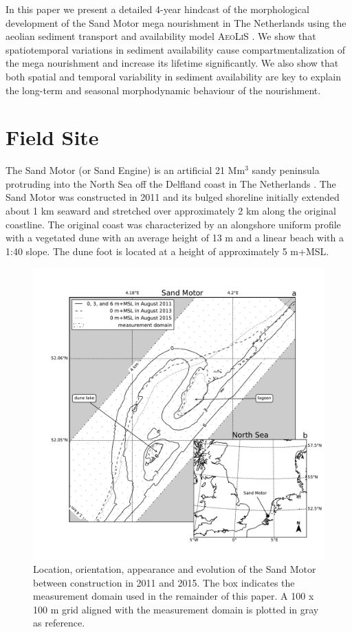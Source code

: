 \documentclass[preprint,12pt,authoryear]{elsarticle}
\begin{document}
In this paper we present a detailed 4-year hindcast of the
morphological development of the Sand Motor mega nourishment in The
Netherlands using the aeolian sediment transport and availability
model \textsc{AeoLiS} \citep{Hoonhout2016}. We show that
spatiotemporal variations in sediment availability cause
compartmentalization of the mega nourishment and increase its lifetime
significantly. We also show that both spatial and temporal variability
in sediment availability are key to explain the long-term and seasonal
morphodynamic behaviour of the nourishment.

\section{Field Site}
\label{sec:fieldsite3}

The Sand Motor (or Sand Engine) is an artificial 21 $\mathrm{Mm^3}$
sandy peninsula protruding into the North Sea off the Delfland coast
in The Netherlands \citep[Figure \ref{fig:fieldsite3},][]{Stive2013}.
The Sand Motor was constructed in 2011 and its bulged shoreline
initially extended about 1 km seaward and stretched over approximately
2 km along the original coastline. The original coast was
characterized by an alongshore uniform profile with a vegetated dune
with an average height of 13 m and a linear beach with a 1:40
slope. The dune foot is located at a height of approximately 5 m+MSL.

\begin{figure}
  \centering
  \includegraphics[width=\columnwidth]{../Figures/location_and_evolution}
  \caption{Location, orientation, appearance and evolution of the Sand
    Motor between construction in 2011 and 2015. The box indicates the
    measurement domain used in the remainder of this paper. A 100 x
    100 m grid aligned with the measurement domain is plotted in gray
    as reference.}
  \label{fig:fieldsite3}
\end{figure}
\end{document}
